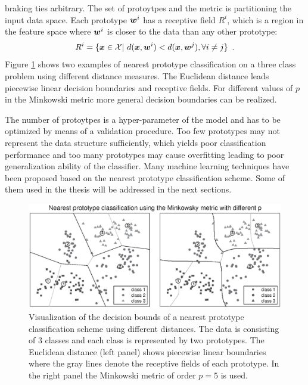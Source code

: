 braking ties arbitrary. The set of protoytpes and the metric is partitioning the input data space. 
Each prototype $\boldsymbol{w}^i$ has a receptive field $R^i$, which is a region in the feature space where $\boldsymbol{w}^i$ 
is closer to the data than any other prototype:
\begin{equation}
\label{eq:Receptive_field_prototypes}
 R^i = \{ \boldsymbol{x}\in \mathcal{X}|\ d(\boldsymbol{x},\boldsymbol{w}^i)<d(\boldsymbol{x},\boldsymbol{w}^j), \forall i\neq j \} \enspace .
\end{equation}
Figure \ref{fig:NPC} shows two examples of nearest prototype classification on a three class problem using different distance measures. 
The Euclidean distance leads piecewise linear decision boundaries and receptive fields. 
For different values of $p$ in the Minkowski metric more general decision boundaries can be realized. 

The number of protoytpes is a hyper-parameter of the model and has to be optimized by means of a validation procedure.  
Too few prototypes may not represent the data structure sufficiently, which yields poor classification performance and 
too many prototypes may cause overfitting leading to poor generalization ability of the classifier. 
Many machine learning techniques have been proposed based on the nearest prototype classification scheme. 
Some of them used in the thesis will be addressed in the next sections. 

\begin{figure}[tpb]
\centering
\includegraphics[width=\textwidth]{pics/NPC.eps}%
\caption[Nearest prototype classification]{Visualization of the decision bounds of a nearest prototype classification scheme 
using different distances. The data is consisting of 3 classes and each class is represented by two prototypes. 
The Euclidean distance (left panel) shows piecewise linear boundaries where the gray lines denote the receptive fields of each prototype. 
In the right panel the Minkowski metric of order $p=5$ is used.%
}
\label{fig:NPC}
\end{figure}